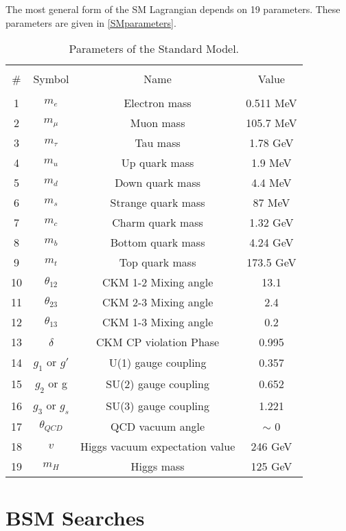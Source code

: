 The most general form of the SM Lagrangian depends on 19 parameters. These parameters are given in \autoref{SMparameters}.
\begin{table*}[h]
	{\setlength{\tabcolsep}{14pt}
		\caption{Parameters of the Standard Model.}
		\begin{center}
			\vspace{-6mm}
			\begin{tabular}{cccc}
				\hline \\[-2.45ex] \hline \\[-2.1ex]
				\# & Symbol & Name & Value \\
				\hline \\[-1.8ex]
				1 & $m_e$ & Electron mass & 0.511 MeV \\
				2 & $m_\mu$ & Muon mass & 105.7 MeV \\
				3 & $m_\tau$ & Tau mass & 1.78 GeV \\
				4 & $m_u$ & Up quark mass & 1.9 MeV \\
				5 & $m_d$ & Down quark mass & 4.4 MeV \\
				6 & $m_s$ & Strange quark mass & 87 MeV \\
				7 & $m_c$ & Charm quark mass & 1.32 GeV \\
				8 & $m_b$ & Bottom quark mass & 4.24 GeV \\
				9 & $m_t$ & Top quark mass & 173.5 GeV \\
				10 & $\theta_{12}$ & CKM 1-2 Mixing angle & 13.1\textdegree \\
				11 & $\theta_{23}$ & CKM 2-3 Mixing angle & 2.4\textdegree \\
				12 & $\theta_{13}$ & CKM 1-3 Mixing angle & 0.2\textdegree \\
				13 & $\delta$ & CKM CP violation Phase & 0.995 \\
				14 & $g_1$ or $g\prime$ & U(1) gauge coupling & 0.357 \\
				15 & $g_2$ or g & SU(2) gauge coupling & 0.652 \\
				16 & $g_3$ or $g_s$ & SU(3) gauge coupling & 1.221 \\
				17 & $\theta_{QCD}$ & QCD vacuum angle & $\sim $ 0 \\
				18 & $v$ & Higgs vacuum expectation value & 246 GeV \\
				19 & $m_H$ & Higgs mass & 125 GeV \\
				\hline
			\end{tabular}
			\vspace{-6mm}
		\end{center}
		\label{SMparameters}}
\end{table*}


\section{BSM Searches}

